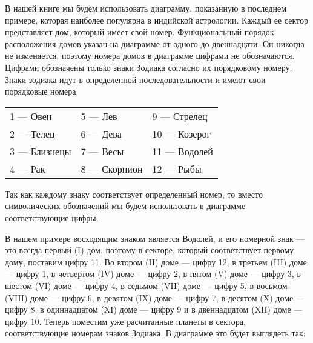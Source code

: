 В нашей книге мы будем использовать диаграмму, показанную в последнем примере, которая наиболее популярна в индийской астрологии. Каждый ее сектор представляет дом, который имеет свой номер. Функциональный порядок расположения домов указан на диаграмме от одного до двеннадцати. Он никогда не изменяется, поэтому номера домов в диаграмме цифрами не обозначаются. Цифрами обозначены только знаки Зодиака согласно их порядковому номеру. Знаки зодиака идут в определенной последовательности и имеют свои порядковые номера:


\begin{table}[tph!]
	\centering

	\renewcommand{\arraystretch}{1.5}

	\begin{tabular}{lll}
		1 --- Овен     & 5 --- Лев      & 9 --- Стрелец \\
		2 --- Телец    & 6 --- Дева     & 10 --- Козерог \\
		3 --- Близнецы & 7 --- Весы     & 11 --- Водолей \\
		4 --- Рак      & 8 --- Скорпион & 12 --- Рыбы \\
	\end{tabular}
\end{table}

Так как каждому знаку соответствует определенный номер, то вместо символических обозначений мы будем использовать в диаграмме соответствующие цифры.

В нашем примере восходящим знаком является Водолей, и его номерной знак --- это всегда первый (I) дом, поэтому в секторе, который соответствует первому дому, поставим цифру 11. Во втором (II) доме --- цифру 12, в третьем (III) доме --- цифру 1, в четвертом (IV) доме --- цифру 2, в пятом (V) доме --- цифру 3, в  шестом (VI) доме --- цифру 4, в седьмом (VII) доме --- цифру 5, в восьмом (VIII) доме --- цифру 6, в девятом (IX) доме --- цифру 7, в десятом (X) доме --- цифру 8, в одиннадцатом (XI) доме --- цифру 9 и в двеннадцатом (XII) доме --- цифру 10. Теперь поместим уже расчитанные планеты в сектора, соответствующие номерам знаков Зодиака. В диаграмме это будет выглядеть так:

\natal[asc=11,three=Луна\\Кету,nine=Раху\\Юпитер\\Марс,ten=Солнце\\Сатурн,eleven=Меркурий,twelve=Венера]{}

